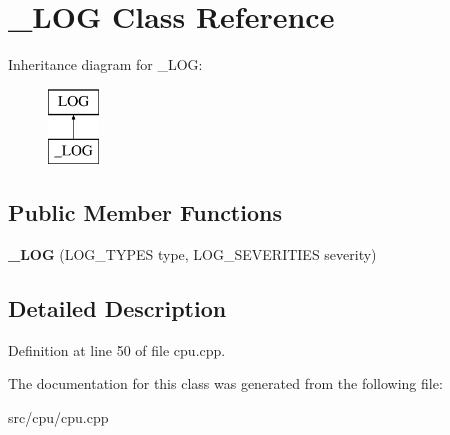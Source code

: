 \hypertarget{class__LOG}{\section{\-\_\-\-L\-O\-G Class Reference}
\label{class__LOG}
}
Inheritance diagram for \-\_\-\-L\-O\-G\-:\begin{figure}[H]
\begin{center}
\leavevmode
\includegraphics[height=2.000000cm]{class__LOG}
\end{center}
\end{figure}
\subsection*{Public Member Functions}
\begin{DoxyCompactItemize}
\item 
\hypertarget{class__LOG_ab6d547f5964f90ac3e7dbbb4cbf46713}{{\bfseries \-\_\-\-L\-O\-G} (L\-O\-G\-\_\-\-T\-Y\-P\-E\-S type, L\-O\-G\-\_\-\-S\-E\-V\-E\-R\-I\-T\-I\-E\-S severity)}\label{class__LOG_ab6d547f5964f90ac3e7dbbb4cbf46713}

\end{DoxyCompactItemize}


\subsection{Detailed Description}


Definition at line 50 of file cpu.\-cpp.



The documentation for this class was generated from the following file\-:\begin{DoxyCompactItemize}
\item 
src/cpu/cpu.\-cpp\end{DoxyCompactItemize}
